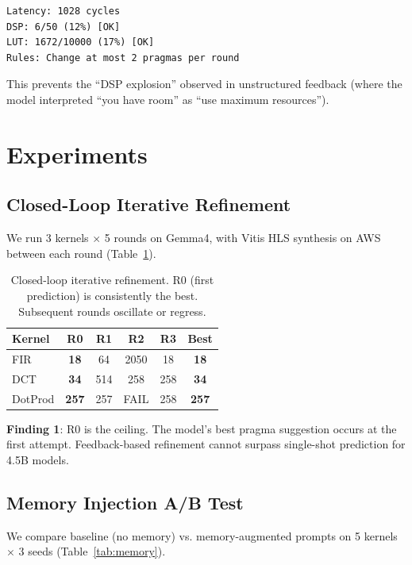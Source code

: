 \documentclass[conference]{IEEEtran}
\begin{document}
\begin{verbatim}
Latency: 1028 cycles
DSP: 6/50 (12%) [OK]
LUT: 1672/10000 (17%) [OK]
Rules: Change at most 2 pragmas per round
\end{verbatim}

This prevents the ``DSP explosion'' observed in unstructured feedback
(where the model interpreted ``you have room'' as ``use maximum
resources'').

\section{Experiments}

\subsection{Closed-Loop Iterative Refinement}

We run 3 kernels $\times$ 5 rounds on Gemma4, with Vitis HLS
synthesis on AWS between each round (Table~\ref{tab:iterative}).

\begin{table}[t]
\centering
\caption{Closed-loop iterative refinement. R0 (first prediction)
is consistently the best. Subsequent rounds oscillate or regress.}
\label{tab:iterative}
\begin{tabular}{lccccc}
\toprule
\textbf{Kernel} & \textbf{R0} & \textbf{R1} & \textbf{R2} & \textbf{R3} & \textbf{Best} \\
\midrule
FIR      & \textbf{18}  & 64    & 2050  & 18   & \textbf{18} \\
DCT      & \textbf{34}  & 514   & 258   & 258  & \textbf{34} \\
DotProd  & \textbf{257} & 257   & FAIL  & 258  & \textbf{257} \\
\bottomrule
\end{tabular}
\end{table}

\textbf{Finding 1}: R0 is the ceiling. The model's best pragma
suggestion occurs at the first attempt. Feedback-based refinement
cannot surpass single-shot prediction for 4.5B models.

\subsection{Memory Injection A/B Test}

We compare baseline (no memory) vs. memory-augmented prompts
on 5 kernels $\times$ 3 seeds (Table~\ref{tab:memory}).
\end{document}
